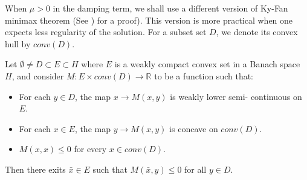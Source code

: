 \documentclass[reqno]{amsart}
\begin{document}
When $\mu>0$ in the damping term,
we shall  use a different
 version of Ky-Fan minimax theorem
(See \cite[Lemma 12.1]{NG}) for a proof).
This version  is more practical when one expects less regularity of  the solution.
For a subset set $D$,  we denote its convex hull by $conv(D)$.

\begin{lemma} \label{Ky Fan 1}
Let \(\emptyset \neq D\subset E \subset H\) where \(E\) is  a weakly compact convex
set in a Banach space \(H\), and consider
\(M : E \times conv(D)\to{\mathbb{R}}\) to be a function such that:
\begin{itemize}
    \item[(1)] For each \(y\in D\), the map \(x \to M(x, y)\) is weakly lower semi-
    continuous on \(E\).
    \item[(2)]  For each \(x \in E\), the map \(y \to M(x, y)\) is concave on \(conv(D)\).
    \item[(3)]  \(M(x, x) \leq 0\) for every \(x \in conv(D)\).
\end{itemize}
Then there exits \(\bar{x} \in E\) such that \(M(\bar{x}, y) \leq 0\) for all
\(y \in D\).
\end{lemma}
\end{document}
